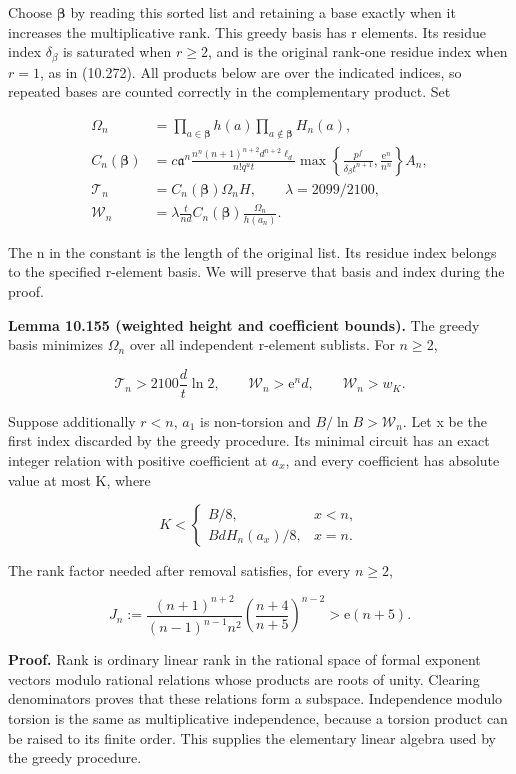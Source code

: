 \documentclass[
  11pt,
  a4paper,
]{article}
\begin{document}
Choose \(\boldsymbol\beta\) by reading this sorted list and retaining a
base exactly when it increases the multiplicative rank. This greedy
basis has r elements. Its residue index \(\delta_\beta\) is saturated
when \(r\ge2\), and is the original rank-one residue index when \(r=1\),
as in (10.272). All products below are over the indicated indices, so
repeated bases are counted correctly in the complementary product. Set

\[
\begin{aligned}
\Omega_n&=\prod_{a\in\boldsymbol\beta}h(a)
              \prod_{a\notin\boldsymbol\beta}H_n(a),\\
C_n(\boldsymbol\beta)&=c\mathfrak a^n
\frac{n^n(n+1)^{n+2}d^{n+2}\ell_d}{n!q^ut}
\max\left\{\frac{p^f}{\delta_\beta t^{n+1}},
                  \frac{\mathrm e^n}{n^n}\right\}A_n,\\
\mathcal T_n&=C_n(\boldsymbol\beta)\Omega_nH,
\qquad \lambda=2099/2100,\\
\mathcal W_n&=\lambda\frac{t}{nd}
 C_n(\boldsymbol\beta)\frac{\Omega_n}{h(a_n)}.
\end{aligned}
\tag{10.471}
\]

The n in the constant is the length of the original list. Its residue
index belongs to the specified r-element basis. We will preserve that
basis and index during the proof.

\textbf{Lemma 10.155 (weighted height and coefficient bounds).} The
greedy basis minimizes \(\Omega_n\) over all independent r-element
sublists. For \(n\ge2\),

\[
\mathcal T_n>2100\frac d t\ln2,
\qquad \mathcal W_n>\mathrm e^nd,
\qquad \mathcal W_n>w_K.
\tag{10.472}
\]

Suppose additionally \(r<n\), \(a_1\) is non-torsion and
\(B/\ln B>\mathcal W_n\). Let x be the first index discarded by the
greedy procedure. Its minimal circuit has an exact integer relation with
positive coefficient at \(a_x\), and every coefficient has absolute
value at most K, where

\[
K<\begin{cases}
B/8,&x<n,\\
BdH_n(a_x)/8,&x=n.
\end{cases}
\tag{10.473}
\]

The rank factor needed after removal satisfies, for every \(n\ge2\),

\[
J_n:=\frac{(n+1)^{n+2}}{(n-1)^{n-1}n^2}
       \left(\frac{n+4}{n+5}\right)^{n-2}
>\mathrm e(n+5).
\tag{10.474}
\]

\textbf{Proof.} Rank is ordinary linear rank in the rational space of
formal exponent vectors modulo rational relations whose products are
roots of unity. Clearing denominators proves that these relations form a
subspace. Independence modulo torsion is the same as multiplicative
independence, because a torsion product can be raised to its finite
order. This supplies the elementary linear algebra used by the greedy
procedure.
\end{document}
